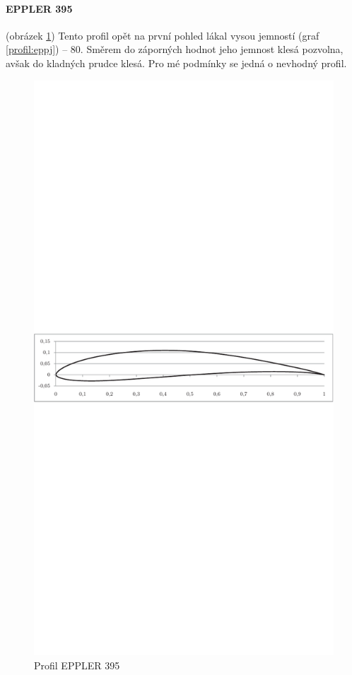 	\paragraph{EPPLER 395} (obrázek \ref{profil:epp}) Tento profil opět na první pohled lákal vysou jemností (graf \ref{profil:eppj}) – 80. Směrem do záporných hodnot jeho jemnost klesá pozvolna, avšak do kladných prudce klesá. Pro mé podmínky se jedná o nevhodný profil.
	\begin{figure}[H]
			\centering
			\includegraphics[]{obrazky/grafy/eppp}
			\caption{Profil EPPLER 395}
			\label{profil:epp}
		\end{figure}
